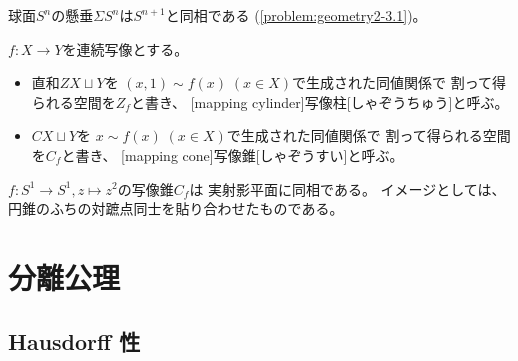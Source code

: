 \documentclass[report]{jlreq}
\begin{document}
\begin{example}[柱、錐、懸垂の例]
    \TODO{}
\end{example}

\begin{example}[球面の懸垂]
    球面$S^n$の懸垂$\Sigma S^n$は$S^{n + 1}$と同相である
    (\cref{problem:geometry2-3.1})。
\end{example}

\begin{definition}
    $f \colon X \to Y$を連続写像とする。
    \begin{itemize}
        \item 直和$ZX \sqcup Y$を
            $(x, 1) \sim f(x)\; (x \in X)$で生成された同値関係で
            割って得られる空間を$Z_f$と書き、
            [mapping cylinder]{写像柱}[しゃぞうちゅう]と呼ぶ。
        \item $CX \sqcup Y$を
            $x \sim f(x)\; (x \in X)$で生成された同値関係で
            割って得られる空間を$C_f$と書き、
            [mapping cone]{写像錐}[しゃぞうすい]と呼ぶ。
    \end{itemize}
\end{definition}

\begin{example}[写像錐の例]
    $f \colon S^1 \to S^1, z \mapsto z^2$の写像錐$C_f$は
    実射影平面に同相である。
    イメージとしては、円錐のふちの対蹠点同士を貼り合わせたものである。
    \TODO{}
\end{example}



%
\chapter{分離公理}

%
\section{Hausdorff 性}

\begin{definition}[Hausdorff]
    \TODO{}
\end{definition}

\begin{proposition}
    \TODO{}
\end{proposition}
\end{document}
